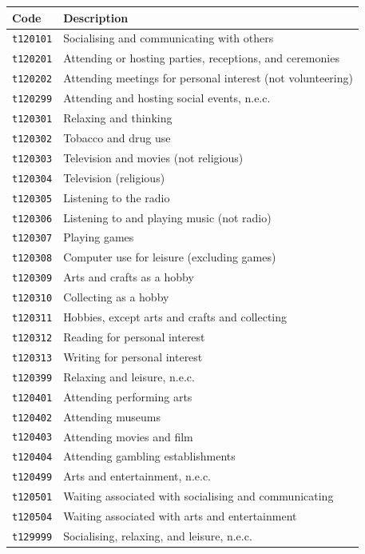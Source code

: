 \documentclass[11pt, a4paper]{article}
\begin{document}
\begin{longtable}{L{3cm} L{13cm}}
\toprule \textbf{Code} & \textbf{Description} \\ \midrule \endhead
\bottomrule \endfoot
\texttt{t120101} & Socialising and communicating with others \\
 \texttt{t120201} & Attending or hosting parties, receptions, and ceremonies \\
\texttt{t120202} & Attending meetings for personal interest (not volunteering) \\
 \texttt{t120299} & Attending and hosting social events, n.e.c. \\
\texttt{t120301} & Relaxing and thinking \\
 \texttt{t120302} & Tobacco and drug use \\
\texttt{t120303} & Television and movies (not religious) \\
 \texttt{t120304} & Television (religious) \\
\texttt{t120305} & Listening to the radio \\
 \texttt{t120306} & Listening to and playing music (not radio) \\
\texttt{t120307} & Playing games \\
 \texttt{t120308} & Computer use for leisure (excluding games) \\
\texttt{t120309} & Arts and crafts as a hobby \\
 \texttt{t120310} & Collecting as a hobby \\
\texttt{t120311} & Hobbies, except arts and crafts and collecting \\
 \texttt{t120312} & Reading for personal interest \\
\texttt{t120313} & Writing for personal interest \\
 \texttt{t120399} & Relaxing and leisure, n.e.c. \\
\texttt{t120401} & Attending performing arts \\
 \texttt{t120402} & Attending museums \\
\texttt{t120403} & Attending movies and film \\
 \texttt{t120404} & Attending gambling establishments \\
\texttt{t120499} & Arts and entertainment, n.e.c. \\
 \texttt{t120501} & Waiting associated with socialising and communicating \\
\texttt{t120504} & Waiting associated with arts and entertainment \\
 \texttt{t129999} & Socialising, relaxing, and leisure, n.e.c. \\
\end{longtable}
\end{document}
